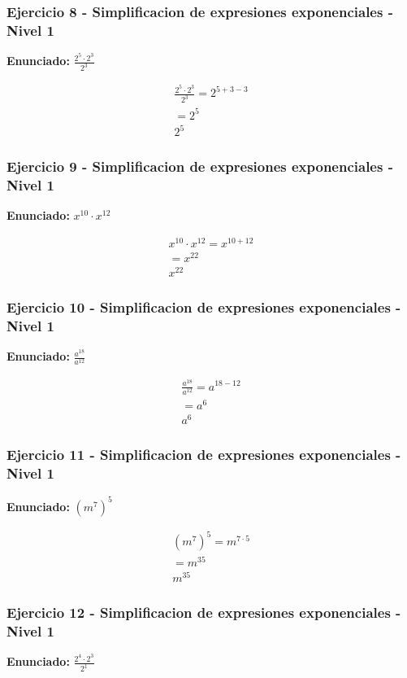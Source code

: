 \documentclass[12pt,a4paper]{article}
\begin{document}
\subsubsection*{Ejercicio 8 - Simplificacion de expresiones exponenciales - Nivel 1}
\textbf{Enunciado:} \(\frac{2^{5}\cdot 2^{3}}{2^{3}}\)

\[
\begin{aligned}
\frac{2^{5}\cdot 2^{3}}{2^{3}}=2^{5+3-3}\\
=2^{5}\\
\boxed{2^{5}}
\end{aligned}
\]


\subsubsection*{Ejercicio 9 - Simplificacion de expresiones exponenciales - Nivel 1}
\textbf{Enunciado:} \(x^{10}\cdot x^{12}\)

\[
\begin{aligned}
x^{10}\cdot x^{12}=x^{10+12}\\
=x^{22}\\
\boxed{x^{22}}
\end{aligned}
\]


\subsubsection*{Ejercicio 10 - Simplificacion de expresiones exponenciales - Nivel 1}
\textbf{Enunciado:} \(\frac{a^{18}}{a^{12}}\)

\[
\begin{aligned}
\frac{a^{18}}{a^{12}}=a^{18-12}\\
=a^{6}\\
\boxed{a^{6}}
\end{aligned}
\]


\subsubsection*{Ejercicio 11 - Simplificacion de expresiones exponenciales - Nivel 1}
\textbf{Enunciado:} \(\left(m^{7}\right)^{5}\)

\[
\begin{aligned}
\left(m^{7}\right)^{5}=m^{7\cdot 5}\\
=m^{35}\\
\boxed{m^{35}}
\end{aligned}
\]


\subsubsection*{Ejercicio 12 - Simplificacion de expresiones exponenciales - Nivel 1}
\textbf{Enunciado:} \(\frac{2^{4}\cdot 2^{3}}{2^{1}}\)
\end{document}
